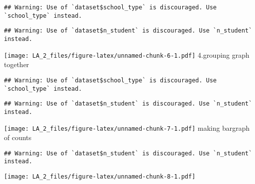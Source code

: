 \documentclass[
]{article}
\newenvironment{Shaded}{\begin{snugshade}}{\end{snugshade}}
\newcommand{\AttributeTok}[1]{\textcolor[rgb]{0.77,0.63,0.00}{#1}}
\newcommand{\FunctionTok}[1]{\textcolor[rgb]{0.00,0.00,0.00}{#1}}
\newcommand{\NormalTok}[1]{#1}
\newcommand{\SpecialCharTok}[1]{\textcolor[rgb]{0.00,0.00,0.00}{#1}}
\newcommand{\StringTok}[1]{\textcolor[rgb]{0.31,0.60,0.02}{#1}}
\begin{document}
\begin{verbatim}
## Warning: Use of `dataset$school_type` is discouraged. Use `school_type` instead.
\end{verbatim}

\begin{verbatim}
## Warning: Use of `dataset$n_student` is discouraged. Use `n_student` instead.
\end{verbatim}

\texttt{[image: LA\_2\_files/figure-latex/unnamed-chunk-6-1.pdf]}
4.grouping graph together

\begin{Shaded}
\end{Shaded}

\begin{verbatim}
## Warning: Use of `dataset$school_type` is discouraged. Use `school_type` instead.
\end{verbatim}

\begin{verbatim}
## Warning: Use of `dataset$n_student` is discouraged. Use `n_student` instead.
\end{verbatim}

\texttt{[image: LA\_2\_files/figure-latex/unnamed-chunk-7-1.pdf]} making
bargraph of counts

\begin{Shaded}
\end{Shaded}

\begin{verbatim}
## Warning: Use of `dataset$n_student` is discouraged. Use `n_student` instead.
\end{verbatim}

\texttt{[image: LA\_2\_files/figure-latex/unnamed-chunk-8-1.pdf]}
\end{document}
